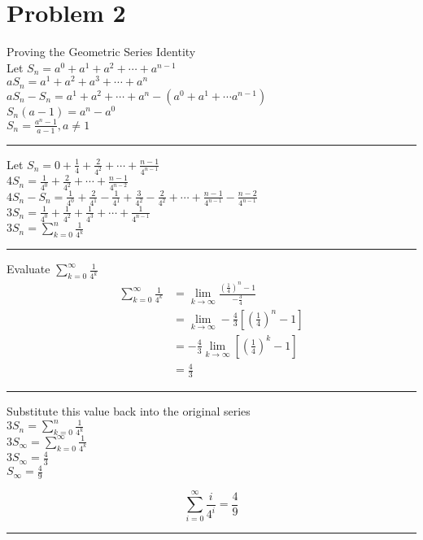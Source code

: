 \section*{Problem 2}
\noindent
Proving the Geometric Series Identity\\
Let $\displaystyle S_n=a^0+a^1+a^2+\cdots+a^{n-1}$\\
$\displaystyle aS_n=a^1+a^2+a^3+\cdots+a^{n}$\\
$\displaystyle aS_n-S_n=a^1+a^2+\cdots+a^{n}-(a^0+a^1+\cdots a^{n-1})$\\
$\displaystyle S_n(a-1)=a^{n}-a^0$\\
$\displaystyle S_n=\frac{a^{n}-1}{a-1},a\neq1$

\begin{center}
\rule{\textwidth}{.1pt}
\end{center}

\noindent
Let $\displaystyle S_n=0+\frac{1}{4}+\frac{2}{4^2}+\cdots+\frac{n-1}{4^{n-1}}$\\
$\displaystyle 4S_n=\frac{1}{4^0}+\frac{2}{4^2}+\cdots+\frac{n-1}{4^{n-2}}$\\
$\displaystyle 4S_n-S_n=\frac{1}{4^0}+\frac{2}{4^1}-\frac{1}{4^1}+\frac{3}{4^2}-\frac{2}{4^2}+\cdots+\frac{n-1}{4^{n-1}}-\frac{n-2}{4^{n-1}}$\\
$\displaystyle 3S_n=\frac{1}{4^0}+\frac{1}{4^2}+\frac{1}{4^3}+\cdots+\frac{1}{4^{n-1}}$\\
$\displaystyle 3S_n=\sum_{k=0}^{n}\frac{1}{4^k}$

\begin{center}
\rule{\textwidth}{.1pt}
\end{center}

\noindent
Evaluate $\displaystyle\sum_{k=0}^{\infty}\frac{1}{4^k}$
\begin{align*}
\sum_{k=0}^{\infty}\frac{1}{4^k} &= \lim_{k\to\infty}\frac{\left(\frac{1}{4}\right)^n-1}{-\frac{3}{4}}      \\
                                 &= \lim_{k\to\infty}-\frac{4}{3}\left[\left(\frac{1}{4}\right)^n-1\right]  \\
                                 &= -\frac{4}{3}\lim_{k\to\infty}\left[\left(\frac{1}{4}\right)^k-1\right]  \\
                                 &= \frac{4}{3}
\end{align*}

\begin{center}
\rule{\textwidth}{.1pt}
\end{center}
\clearpage

\noindent
Substitute this value back into the original series\\
$\displaystyle 3S_n=\sum_{k=0}^{n}\frac{1}{4^k}$\\
$\displaystyle 3S_{\infty}=\sum_{k=0}^{\infty}\frac{1}{4^k}$\\
$\displaystyle 3S_{\infty}=\frac{4}{3}$\\
$\displaystyle S_{\infty}=\frac{4}{9}$

\[
    \sum_{i=0}^{\infty}\frac{i}{4^i}=\frac{4}{9}
\]

\begin{center}
\rule{\textwidth}{3pt}
\end{center}

